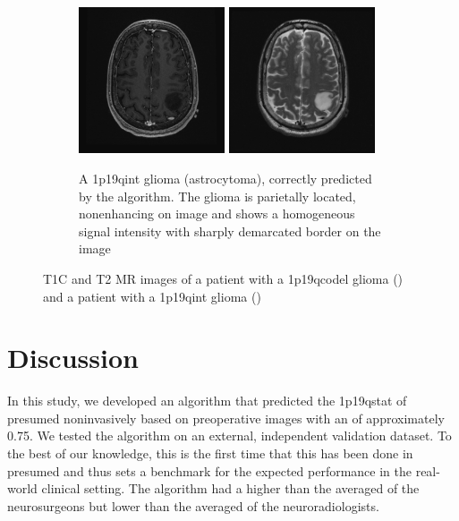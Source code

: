 \begin{figure}
     \begin{subfigure}[b]{0.8\textwidth}
         \centering
         \includegraphics[width=0.475\textwidth]{Figures/LGG_625_intact_example_T1.png}
         \includegraphics[width=0.475\textwidth]{Figures/LGG_625_intact_example_T2.png}
         \caption{A \acl{1p19qint} glioma (astrocytoma), correctly predicted by the algorithm. The glioma is parietally located, nonenhancing on   image and shows a homogeneous signal intensity with sharply demarcated border on the   image}\label{fig:LGG_1p19q_example_intact}
     \end{subfigure}

        \caption{\acrshort{T1C} and \acrshort{T2} \acrshort{MR} images of a patient with a \acl{1p19qcodel} glioma (\protect{}) and a patient with a \acl{1p19qint} glioma (\protect{})}\label{fig:LGG_1p19q_Examples}
\end{figure}



\section{Discussion}

In this study, we developed an algorithm that predicted the \acl{1p19qstat} of presumed  noninvasively based on preoperative  images with an  of approximately \num{0.75}.
We tested the algorithm on an external, independent validation dataset.
To the best of our knowledge, this is the first time that this has been done in presumed  and thus sets a benchmark for the expected performance in the real-world clinical setting.
The algorithm had a higher  than the averaged  of the neurosurgeons but lower than the averaged  of the neuroradiologists.

